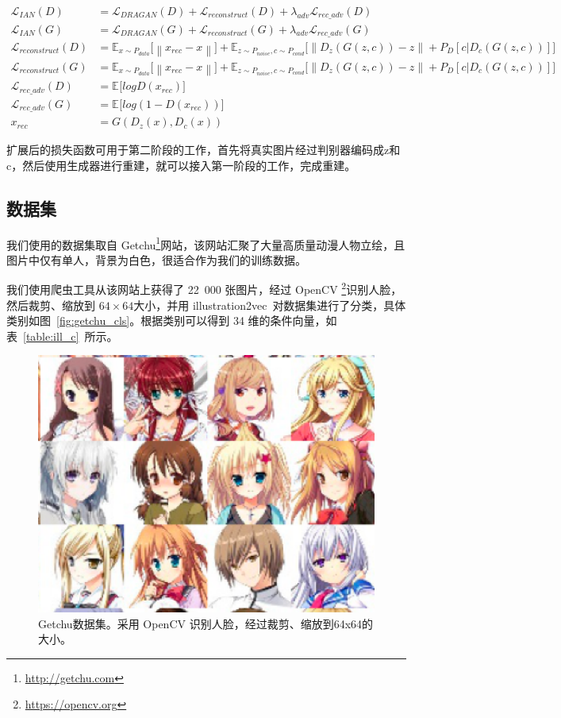 \documentclass[a4paper,12pt,UTF8]{ctexart}
\newcommand{\norm}[1]{\left\lVert#1\right\rVert}
\newcommand{\kai}{\CJKfamily{zhkai}}	%
\begin{document}
\begin{align}
\mathcal{L}_{IAN}(D) &= \mathcal{L}_{DRAGAN}(D) + \mathcal{L}_{reconstruct}(D) + \lambda_{adv} \mathcal{L}_{rec\_adv}(D)\\
\mathcal{L}_{IAN}(G) &= \mathcal{L}_{DRAGAN}(G) + \mathcal{L}_{reconstruct}(G) + \lambda_{adv} \mathcal{L}_{rec\_adv}(G) \\
\mathcal{L}_{reconstruct}(D) &= \mathbb{E}_{x \sim P_{data}} \big[ \norm{x_{rec} - x} \big] + \mathbb{E}_{z\sim P_{noise},c\sim P_{cond}} \big[\norm{D_z(G(z, c)) - z} + P_D[c|D_c(G(z, c))] \big] \\
\mathcal{L}_{reconstruct}(G) &= \mathbb{E}_{x \sim P_{data}} \big[ \norm{x_{rec} - x} \big] + \mathbb{E}_{z\sim P_{noise},c\sim P_{cond}} \big[\norm{D_z(G(z, c)) - z} + P_D[c|D_c(G(z, c))] \big] \\
\mathcal{L}_{rec\_adv}(D) &= \mathbb{E}_{} \big[ log D(x_{rec}) \big] \\
\mathcal{L}_{rec\_adv}(G) &= \mathbb{E}_{} \big[ log (1 - D(x_{rec})) \big] \\
x_{rec} &= G(D_z(x), D_c(x))
\end{align}

扩展后的损失函数可用于第二阶段的工作，首先将真实图片经过判别器编码成z和c，然后使用生成器进行重建，就可以接入第一阶段的工作，完成重建。

\subsection{数据集}
我们使用的数据集取自 Getchu\footnote{\url{http://getchu.com}}网站，该网站汇聚了大量高质量动漫人物立绘，且图片中仅有单人，背景为白色，很适合作为我们的训练数据。

我们使用爬虫工具从该网站上获得了 22~000 张图片，经过 OpenCV \footnote{\url{https://opencv.org}}识别人脸，然后裁剪、缩放到 $64\times64$大小，并用 illustration2vec~\cite{Saito2015Illustration2Vec}对数据集进行了分类，具体类别如图~\ref{fig:getchu_cls}。根据类别可以得到 34 维的条件向量，如表~\ref{table:ill_c}~所示。

\begin{figure}[H]
  \centering
  \includegraphics[width=0.5\linewidth]{figs/ex6.png}
  \caption{\kai Getchu数据集。采用 OpenCV 识别人脸，经过裁剪、缩放到64x64的大小。}
  \label{fig:getchu_disp}
\end{figure}
\end{document}
